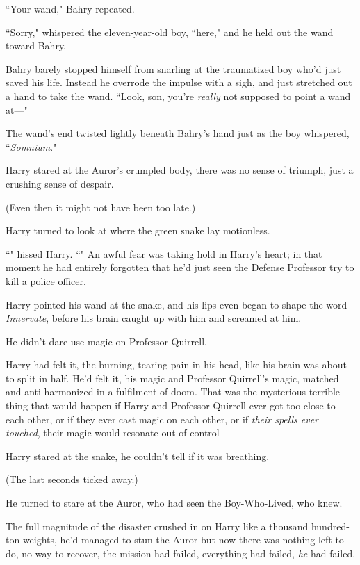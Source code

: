 ``Your wand," Bahry repeated.

``Sorry," whispered the eleven-year-old boy, ``here," and he held out the wand toward Bahry.

Bahry barely stopped himself from snarling at the traumatized boy who'd just saved his life. Instead he overrode the impulse with a sigh, and just stretched out a hand to take the wand. ``Look, son, you're \emph{really} not supposed to point a wand at—"

The wand's end twisted lightly beneath Bahry's hand just as the boy whispered, ``\emph{Somnium}."

\later

Harry stared at the Auror's crumpled body, there was no sense of triumph, just a crushing sense of despair.

(Even then it might not have been too late.)

Harry turned to look at where the green snake lay motionless.

``" hissed Harry. ``" An awful fear was taking hold in Harry's heart; in that moment he had entirely forgotten that he'd just seen the Defense Professor try to kill a police officer.

Harry pointed his wand at the snake, and his lips even began to shape the word \emph{Innervate}, before his brain caught up with him and screamed at him.

He didn't dare use magic on Professor Quirrell.

Harry had felt it, the burning, tearing pain in his head, like his brain was about to split in half. He'd felt it, his magic and Professor Quirrell's magic, matched and anti-harmonized in a fulfilment of doom. That was the mysterious terrible thing that would happen if Harry and Professor Quirrell ever got too close to each other, or if they ever cast magic on each other, or if \emph{their spells ever touched}, their magic would resonate out of control—

Harry stared at the snake, he couldn't tell if it was breathing.

(The last seconds ticked away.)

He turned to stare at the Auror, who had seen the Boy-Who-Lived, who knew.

The full magnitude of the disaster crushed in on Harry like a thousand hundred-ton weights, he'd managed to stun the Auror but now there was nothing left to do, no way to recover, the mission had failed, everything had failed, \emph{he} had failed.

